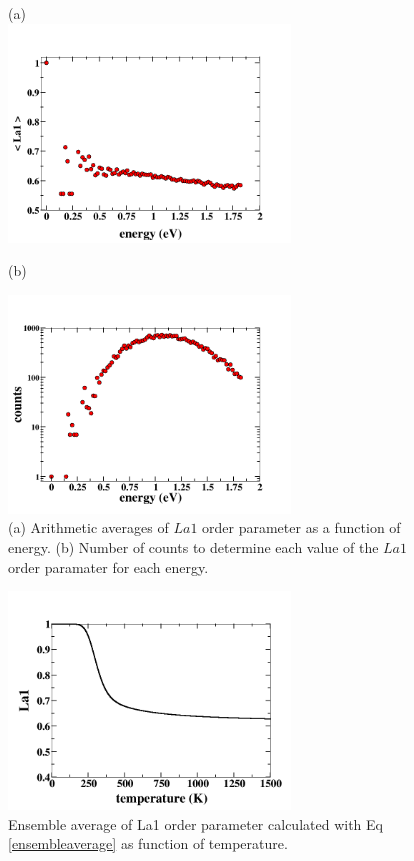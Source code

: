 \documentclass[aps,pre,reprint,superscriptaddress,showkeys]{revtex4-1}
\begin{document}
\begin{figure}
(a)\\
\includegraphics[width=7.5cm]{./figures/avg_OP.png}\\
\centerline{(b)}
\includegraphics[width=7.5cm]{./figures/OPcounts.png}
\caption{(a) Arithmetic averages of $La1$ order parameter as a function of energy. (b) Number of counts to determine each value of the $La1$ order paramater for each energy. \label{arithemetic_avg}}
\end{figure}

\begin{figure}
\includegraphics[width=7.5cm]{./figures/OP_ensemble_avg.png}
\caption{Ensemble average of La1 order parameter calculated with Eq \ref{ensembleaverage} as function of temperature. \label{ensembleOP}}
\end{figure}
\end{document}
